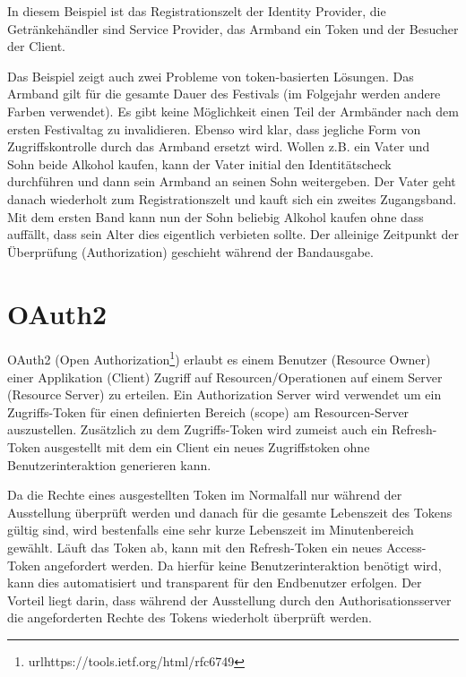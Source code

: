 In diesem Beispiel ist das Registrationszelt der Identity Provider, die Getränkehändler sind Service Provider, das Armband ein Token und der Besucher der Client.

Das Beispiel zeigt auch zwei Probleme von token-basierten Lösungen. Das Armband gilt für die gesamte Dauer des Festivals (im Folgejahr werden andere Farben verwendet). Es gibt keine Möglichkeit einen Teil der Armbänder nach dem ersten Festivaltag zu invalidieren. Ebenso wird klar, dass jegliche Form von Zugriffskontrolle durch das Armband ersetzt wird. Wollen z.B. ein Vater und Sohn beide Alkohol kaufen, kann der Vater initial den Identitätscheck durchführen und dann sein Armband an seinen Sohn weitergeben. Der Vater geht danach wiederholt zum Registrationszelt und kauft sich ein zweites Zugangsband. Mit dem ersten Band kann nun der Sohn beliebig Alkohol kaufen ohne dass auffällt, dass sein Alter dies eigentlich verbieten sollte. Der alleinige Zeitpunkt der Überprüfung (Authorization) geschieht während der Bandausgabe.

\section{OAuth2}

OAuth2 (Open Authorization\footnote{url{https://tools.ietf.org/html/rfc6749}}) erlaubt es einem Benutzer (Resource Owner) einer Applikation (Client) Zugriff auf Resourcen/Operationen auf einem Server (Resource Server) zu erteilen. Ein Authorization Server wird verwendet um ein Zugriffs-Token für einen definierten Bereich (scope) am Resourcen-Server auszustellen. Zusätzlich zu dem Zugriffs-Token wird zumeist auch ein Refresh-Token ausgestellt mit dem ein Client ein neues Zugriffstoken ohne Benutzerinteraktion generieren kann.

Da die Rechte eines ausgestellten Token im Normalfall nur während der Ausstellung überprüft werden und danach für die gesamte Lebenszeit des Tokens gültig sind, wird bestenfalls eine sehr kurze Lebenszeit im Minutenbereich gewählt. Läuft das Token ab, kann mit den Refresh-Token ein neues Access-Token angefordert werden. Da hierfür keine Benutzerinteraktion benötigt wird, kann dies automatisiert und transparent für den Endbenutzer erfolgen. Der Vorteil liegt darin, dass während der Ausstellung durch den Authorisationsserver die angeforderten Rechte des Tokens wiederholt überprüft werden.

